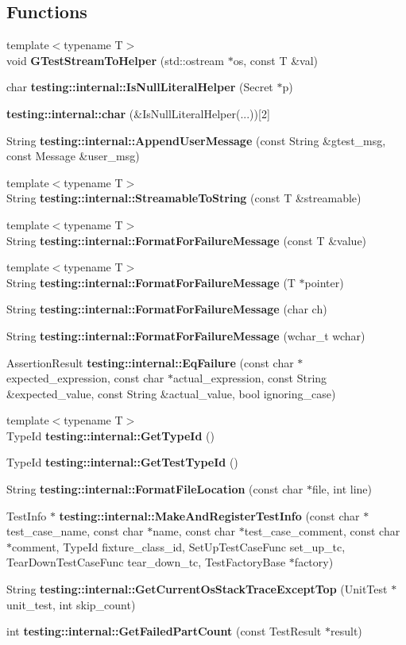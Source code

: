 \subsection*{Functions}
\begin{CompactItemize}
\item 
{\footnotesize template$<$typename T$>$ }\\void {\bf GTestStreamToHelper} (std::ostream $\ast$os, const T \&val)
\item 
char {\bf testing::internal::IsNullLiteralHelper} (Secret $\ast$p)
\item 
{\bf testing::internal::char} (\&IsNullLiteralHelper(...))[2]
\item 
String {\bf testing::internal::AppendUserMessage} (const String \&gtest\_\-msg, const Message \&user\_\-msg)
\item 
{\footnotesize template$<$typename T$>$ }\\String {\bf testing::internal::StreamableToString} (const T \&streamable)
\item 
{\footnotesize template$<$typename T$>$ }\\String {\bf testing::internal::FormatForFailureMessage} (const T \&value)
\item 
{\footnotesize template$<$typename T$>$ }\\String {\bf testing::internal::FormatForFailureMessage} (T $\ast$pointer)
\item 
String {\bf testing::internal::FormatForFailureMessage} (char ch)
\item 
String {\bf testing::internal::FormatForFailureMessage} (wchar\_\-t wchar)
\item 
AssertionResult {\bf testing::internal::EqFailure} (const char $\ast$expected\_\-expression, const char $\ast$actual\_\-expression, const String \&expected\_\-value, const String \&actual\_\-value, bool ignoring\_\-case)
\item 
{\footnotesize template$<$typename T$>$ }\\TypeId {\bf testing::internal::GetTypeId} ()
\item 
TypeId {\bf testing::internal::GetTestTypeId} ()
\item 
String {\bf testing::internal::FormatFileLocation} (const char $\ast$file, int line)
\item 
TestInfo $\ast$ {\bf testing::internal::MakeAndRegisterTestInfo} (const char $\ast$test\_\-case\_\-name, const char $\ast$name, const char $\ast$test\_\-case\_\-comment, const char $\ast$comment, TypeId fixture\_\-class\_\-id, SetUpTestCaseFunc set\_\-up\_\-tc, TearDownTestCaseFunc tear\_\-down\_\-tc, TestFactoryBase $\ast$factory)
\item 
String {\bf testing::internal::GetCurrentOsStackTraceExceptTop} (UnitTest $\ast$unit\_\-test, int skip\_\-count)
\item 
int {\bf testing::internal::GetFailedPartCount} (const TestResult $\ast$result)
\end{CompactItemize}
